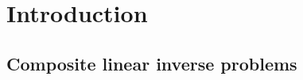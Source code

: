 \documentclass[12pt]{article}
\begin{document}
\section{Introduction}
    

    \subsection{Composite linear inverse problems}
    
\end{document}

